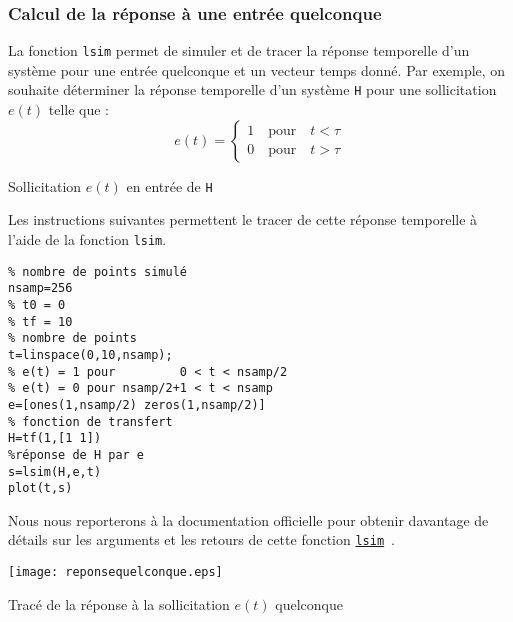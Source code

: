 \subsubsection{Calcul de la réponse à une entrée quelconque}
La fonction \texttt{lsim} permet de simuler et de tracer 
la réponse temporelle d'un système pour une entrée quelconque et un vecteur
temps donné. 
Par exemple, on souhaite déterminer la réponse temporelle 
d'un système \texttt{H} pour une sollicitation $e(t)$ telle que :
\[
    e(t)= \begin{cases}
        1\quad \textrm{pour}\quad t<\tau \\
        0\quad \textrm{pour}\quad t>\tau 
          \end{cases}
\]
\begin{marginfigure}
    \centering
    
    \caption{Sollicitation $e(t)$ en entrée de \texttt{H}}
\end{marginfigure}
Les instructions suivantes permettent le tracer de cette réponse temporelle
à l'aide de la fonction \texttt{lsim}.
\begin{verbatim}
% nombre de points simulé 
nsamp=256
% t0 = 0 
% tf = 10
% nombre de points 
t=linspace(0,10,nsamp);
% e(t) = 1 pour         0 < t < nsamp/2
% e(t) = 0 pour nsamp/2+1 < t < nsamp
e=[ones(1,nsamp/2) zeros(1,nsamp/2)] 
% fonction de transfert
H=tf(1,[1 1])
%réponse de H par e
s=lsim(H,e,t) 
plot(t,s)
\end{verbatim}
Nous nous reporterons à la documentation officielle pour obtenir davantage de
détails sur les arguments et les retours de cette fonction 
\href{https://fr.mathworks.com/help/control/ref/dynamicsystem.lsim.html}{\texttt{lsim}}~\cite{lsim}.
\begin{marginfigure}
    \centering
    \texttt{[image: reponsequelconque.eps]}
    \caption{Tracé de la réponse à la sollicitation $e(t)$ quelconque}
\end{marginfigure}
\clearpage
\restoregeometry
\captionsetup{width=0.9\linewidth}
